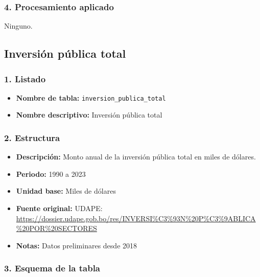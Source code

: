 \documentclass[12pt,a4paper]{article}
\begin{document}
\subsubsection*{4. Procesamiento aplicado}
Ninguno.

\subsection{Inversión pública total}

\subsubsection*{1. Listado}
\begin{itemize}
  \item \textbf{Nombre de tabla:} \texttt{inversion\_publica\_total}
  \item \textbf{Nombre descriptivo:} Inversión pública total
\end{itemize}

\subsubsection*{2. Estructura}
\begin{itemize}
  \item \textbf{Descripción:} Monto anual de la inversión pública total en miles de dólares.
  \item \textbf{Periodo:} 1990 a 2023
  \item \textbf{Unidad base:} Miles de dólares
  \item \textbf{Fuente original:} UDAPE:\\
    \url{https://dossier.udape.gob.bo/res/INVERSI%C3%93N%20P%C3%9ABLICA%20POR%20SECTORES}
  \item \textbf{Notas:} Datos preliminares desde 2018
\end{itemize}

\subsubsection*{3. Esquema de la tabla}
\end{document}
